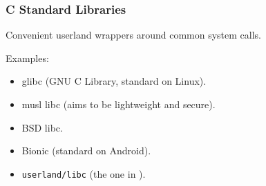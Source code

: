 \begin{frame}

\frametitle{C Standard Libraries}

\vspace{\fill}

\begin{center}

Convenient userland wrappers around common system calls.

\end{center}

\vspace{\fill}

Examples:

\begin{itemize}

\item glibc (GNU C Library, standard on Linux).

\item musl libc (aims to be lightweight and secure).

\item BSD libc.

\item Bionic (standard on Android).

\item \texttt{userland/libc} (the one in \kudos{}).

\end{itemize}

\end{frame}


